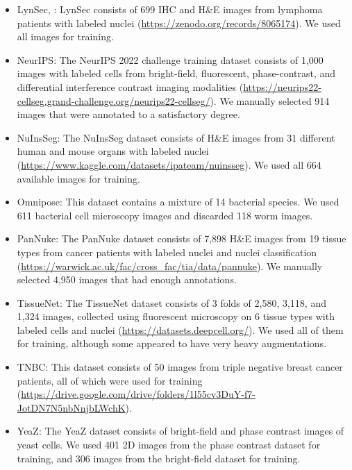 \begin{itemize}
  \item LynSec\cite{linsec}, \cite{lynseccc}: LynSec consists of 699 IHC and H\&E images from lymphoma patients with labeled nuclei 
  (\url{https://zenodo.org/records/8065174}). 
  We used all images for training.

  \item NeurIPS\cite{Neurips}: The NeurIPS 2022 challenge training dataset consists of 1,000 images with labeled cells from bright-field, fluorescent, phase-contrast, and differential interference contrast imaging modalities 
  (\url{https://neurips22-cellseg.grand-challenge.org/neurips22-cellseg/}). 
  We manually selected 914 images that were annotated to a satisfactory degree.

  \item NuInsSeg\cite{NuInsSeg}: The NuInsSeg dataset consists of H\&E images from 31 different human and mouse organs with labeled nuclei 
  (\url{https://www.kaggle.com/datasets/ipateam/nuinsseg}). 
  We used all 664 available images for training.

  \item Omnipose\cite{omnipose}: This dataset contains a mixture of 14 bacterial species. We used 611 bacterial cell
microscopy images and discarded 118 worm images.

  \item PanNuke\cite{pannuke}: The PanNuke dataset consists of 7,898 H\&E images from 19 tissue types from cancer patients with labeled nuclei and nuclei classification 
  (\url{https://warwick.ac.uk/fac/cross_fac/tia/data/pannuke}). 
  We manually selected 4,950 images that had enough annotations.

  \item TissueNet\cite{tissuenet}: The TissueNet dataset consists of 3 folds of 2,580, 3,118, and 1,324 images, collected using fluorescent microscopy on 6 tissue types with labeled cells and nuclei 
  (\url{https://datasets.deepcell.org/}). 
  We used all of them for training, although some appeared to have very heavy augmentations.

  \item TNBC\cite{TNBC}: This dataset consists of 50 images from triple negative breast cancer patients, all of which were used for training 
  (\url{https://drive.google.com/drive/folders/1l55cv3DuY-f7-JotDN7N5nbNnjbLWchK}).

  \item YeaZ\cite{Yeast}: The YeaZ dataset consists of bright-field and phase contrast images of yeast cells. We used 401 2D images from the phase contrast dataset for training, and 306 images from the bright-field dataset for training.
\end{itemize}

